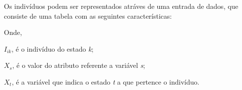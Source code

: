 Os indivíduos podem ser representados atráves de uma entrada de dados, que consiste de uma tabela com as seguintes características:

\begin{table}[!ht]
	\centering
\end{table}

Onde, 

${I_{ik}}$, é o indivíduo do estado \textit{k};

${X_s}$, é o valor do atributo referente a variável \textit{s};

${X_t}$, é a variável que indica o estado \textit{t} a que pertence o indivíduo.

